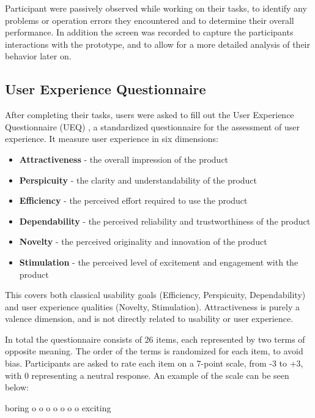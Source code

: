 Participant were passively observed while working on their tasks, to identify any problems or operation errors they encountered and to determine their overall performance.
In addition the screen was recorded to capture the participants interactions with the prototype, and to allow for a more detailed analysis of their behavior later on.

\subsection*{User Experience Questionnaire}
\label{sec:methodology:study:ueq}

After completing their tasks, users were asked to fill out the User Experience Questionnaire (UEQ) \cite{laugwitz_construction_2008}, a standardized questionnaire for the assessment of user experience.
It measure user experience in six dimensions:

\begin{itemize}
  \item \textbf{Attractiveness} - the overall impression of the product
  \item \textbf{Perspicuity} - the clarity and understandability of the product
  \item \textbf{Efficiency} - the perceived effort required to use the product
  \item \textbf{Dependability} - the perceived reliability and trustworthiness of the product
  \item \textbf{Novelty} - the perceived originality and innovation of the product
  \item \textbf{Stimulation} - the perceived level of excitement and engagement with the product
\end{itemize}

This covers both classical usability goals (Efficiency, Perspicuity, Dependability) and user experience qualities (Novelty, Stimulation).
Attractiveness is purely a valence dimension, and is not directly related to usability or user experience.

In total the questionnaire consists of 26 items, each represented by two terms of opposite meaning. 
The order of the terms is randomized for each item, to avoid bias.
Participants are asked to rate each item on a 7-point scale, from -3 to +3, with 0 representing a neutral response.
An example of the scale can be seen below:

\begin{center}
  boring \quad o o o o o o o \quad exciting
\end{center}

